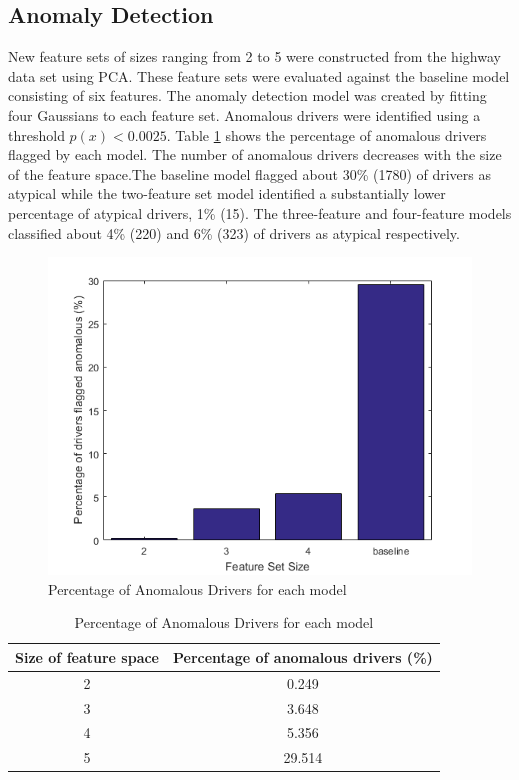 \documentclass[10pt,journal]{IEEEtran}
\begin{document}
\subsection{Anomaly Detection}
New feature sets of sizes ranging from 2 to 5 were constructed from the highway data set using PCA. These feature sets were evaluated against the baseline model consisting of six features. The anomaly detection model was created by fitting four Gaussians to each feature set. Anomalous drivers were identified using a threshold $p(x)<0.0025$. Table  \ref{tab:NumDrivers} shows the percentage of anomalous drivers flagged by each model. The number of anomalous drivers decreases with the size of the feature space.The baseline model flagged about 30\% (1780) of drivers as atypical while the two-feature set model identified a substantially lower percentage of atypical drivers, 1\% (15). The three-feature and four-feature models classified about 4\% (220) and 6\% (323) of drivers as atypical respectively.

\begin{figure}[!t]
	\centering
    \includegraphics[width=0.9\columnwidth]{"Figures/num_drivers"}
	\caption{Percentage of Anomalous Drivers for each model}
    \label{fig:NumDrivers}
\end{figure}

\begin{table}[!t]
\centering
\begin{tabular}[h]{c | c}
\hline
Size of feature space & Percentage of anomalous drivers (\%) \\
\hline
2 & 0.249 \\
3 & 3.648 \\
4 & 5.356 \\
5 & 29.514 \\
\hline
\end{tabular}
\caption{Percentage of Anomalous Drivers for each model}
\label{tab:NumDrivers}
\end{table}
\end{document}
